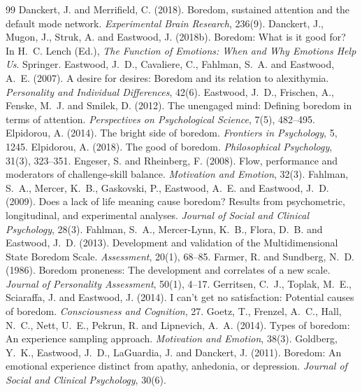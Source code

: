 \documentclass{situationist-preprint}
\begin{document}
\begin{thebibliography}{99}
 Danckert, J. and Merrifield, C. (2018). Boredom, sustained attention and the default mode network. \emph{Experimental Brain Research}, 236(9).
 Danckert, J., Mugon, J., Struk, A. and Eastwood, J. (2018b). Boredom: What is it good for? In H.~C. Lench (Ed.), \emph{The Function of Emotions: When and Why Emotions Help Us}. Springer.
 Eastwood, J.~D., Cavaliere, C., Fahlman, S.~A. and Eastwood, A.~E. (2007). A desire for desires: Boredom and its relation to alexithymia. \emph{Personality and Individual Differences}, 42(6).
 Eastwood, J.~D., Frischen, A., Fenske, M.~J. and Smilek, D. (2012). The unengaged mind: Defining boredom in terms of attention. \emph{Perspectives on Psychological Science}, 7(5), 482--495.
 Elpidorou, A. (2014). The bright side of boredom. \emph{Frontiers in Psychology}, 5, 1245.
 Elpidorou, A. (2018). The good of boredom. \emph{Philosophical Psychology}, 31(3), 323--351.
 Engeser, S. and Rheinberg, F. (2008). Flow, performance and moderators of challenge-skill balance. \emph{Motivation and Emotion}, 32(3).
 Fahlman, S.~A., Mercer, K.~B., Gaskovski, P., Eastwood, A.~E. and Eastwood, J.~D. (2009). Does a lack of life meaning cause boredom? Results from psychometric, longitudinal, and experimental analyses. \emph{Journal of Social and Clinical Psychology}, 28(3).
 Fahlman, S.~A., Mercer-Lynn, K.~B., Flora, D.~B. and Eastwood, J.~D. (2013). Development and validation of the Multidimensional State Boredom Scale. \emph{Assessment}, 20(1), 68--85.
 Farmer, R. and Sundberg, N.~D. (1986). Boredom proneness: The development and correlates of a new scale. \emph{Journal of Personality Assessment}, 50(1), 4--17.
 Gerritsen, C.~J., Toplak, M.~E., Sciaraffa, J. and Eastwood, J. (2014). I can't get no satisfaction: Potential causes of boredom. \emph{Consciousness and Cognition}, 27.
 Goetz, T., Frenzel, A.~C., Hall, N.~C., Nett, U.~E., Pekrun, R. and Lipnevich, A.~A. (2014). Types of boredom: An experience sampling approach. \emph{Motivation and Emotion}, 38(3).
 Goldberg, Y.~K., Eastwood, J.~D., LaGuardia, J. and Danckert, J. (2011). Boredom: An emotional experience distinct from apathy, anhedonia, or depression. \emph{Journal of Social and Clinical Psychology}, 30(6).

\end{thebibliography}
\end{document}
